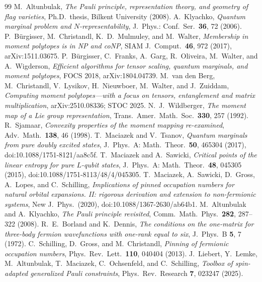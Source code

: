 \documentclass[11pt]{article}
\begin{document}
\begin{thebibliography}{99}
 M.~Altunbulak, \emph{The Pauli principle, representation theory, and geometry of flag varieties}, Ph.D.\ thesis, Bilkent University (2008).
 A.~Klyachko, \emph{Quantum marginal problem and
$N$-representability}, J.\ Phys.: Conf.\ Ser.\ \textbf{36}, 72 (2006).
 P.~B\"urgisser, M.~Christandl, K.~D.~Mulmuley, and
M.~Walter, \emph{Membership in moment polytopes is in NP and coNP},
SIAM J.~Comput.\ \textbf{46}, 972 (2017), arXiv:1511.03675.
 P.~B\"urgisser, C.~Franks, A.~Garg, R.~Oliveira,
M.~Walter, and A.~Wigderson, \emph{Efficient algorithms for tensor scaling,
quantum marginals, and moment polytopes}, FOCS 2018, arXiv:1804.04739.
 M.~van den Berg, M.~Christandl, V.~Lysikov,
H.~Nieuwboer, M.~Walter, and J.~Zuiddam, \emph{Computing moment
polytopes---with a focus on tensors, entanglement and matrix
multiplication}, arXiv:2510.08336; STOC 2025.
 N.~J.~Wildberger, \emph{The moment map of a Lie group
representation}, Trans.\ Amer.\ Math.\ Soc.\ \textbf{330}, 257 (1992).
 R.~Sjamaar, \emph{Convexity properties of the moment mapping
re-examined}, Adv.\ Math.\ \textbf{138}, 46 (1998).
 T.~Maciazek and V.~Tsanov,
\emph{Quantum marginals from pure doubly excited states},
J.~Phys.~A: Math.~Theor.\ \textbf{50}, 465304 (2017),
doi:10.1088/1751-8121/aa8c5f.
 T.~Maciazek and A.~Sawicki,
\emph{Critical points of the linear entropy for pure $L$-qubit states},
J.~Phys.~A: Math.~Theor.\ \textbf{48}, 045305 (2015),
doi:10.1088/1751-8113/48/4/045305.
 T.~Maciazek, A.~Sawicki, D.~Gross, A.~Lopes, and
C.~Schilling, \emph{Implications of pinned occupation numbers for natural
orbital expansions. II: rigorous derivation and extension to non-fermionic
systems}, New J.~Phys.\ (2020), doi:10.1088/1367-2630/ab64b1.
 M.~Altunbulak and A.~Klyachko, \emph{The Pauli principle
revisited}, Comm.\ Math.\ Phys.\ \textbf{282}, 287--322 (2008).
 R.~E.~Borland and K.~Dennis, \emph{The conditions on the
one-matrix for three-body fermion wavefunctions with one-rank equal to six},
J.\ Phys.\ B \textbf{5}, 7 (1972).
 C.~Schilling, D.~Gross, and M.~Christandl, \emph{Pinning
of fermionic occupation numbers}, Phys.\ Rev.\ Lett.\ \textbf{110}, 040404
(2013).
 J.~Liebert, Y.~Lemke, M.~Altunbulak, T.~Maciazek,
C.~Ochsenfeld, and C.~Schilling, \emph{Toolbox of spin-adapted generalized
Pauli constraints}, Phys.\ Rev.\ Research \textbf{7}, 023247 (2025).

\end{thebibliography}
\end{document}
